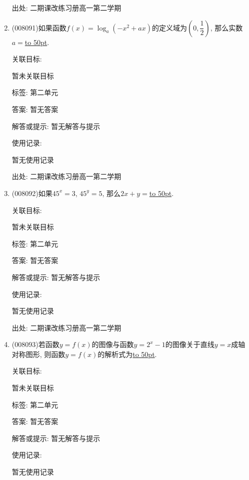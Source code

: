 \documentclass[10pt,a4paper]{article}
\newcommand{\blank}[1]{\underline{\hbox to #1pt{}}}
\begin{document}
\begin{enumerate}[1.]
出处: 二期课改练习册高一第二学期
\item { (008091)}如果函数$f(x)=\log _a(-x^2+ax)$的定义域为$(0,\dfrac 12)$, 那么实数$a=$\blank{50}.


关联目标:

暂未关联目标



标签: 第二单元

答案: 暂无答案

解答或提示: 暂无解答与提示

使用记录:

暂无使用记录


出处: 二期课改练习册高一第二学期
\item { (008092)}如果$45^x=3$, $45^y=5$, 那么$2x+y=$\blank{50}.


关联目标:

暂未关联目标



标签: 第二单元

答案: 暂无答案

解答或提示: 暂无解答与提示

使用记录:

暂无使用记录


出处: 二期课改练习册高一第二学期
\item { (008093)}若函数$y=f(x)$的图像与函数$y=2^x-1$的图像关于直线$y=x$成轴对称图形, 则函数$y=f(x)$的解析式为\blank{50}.


关联目标:

暂未关联目标



标签: 第二单元

答案: 暂无答案

解答或提示: 暂无解答与提示

使用记录:

暂无使用记录



\end{enumerate}
\end{document}
